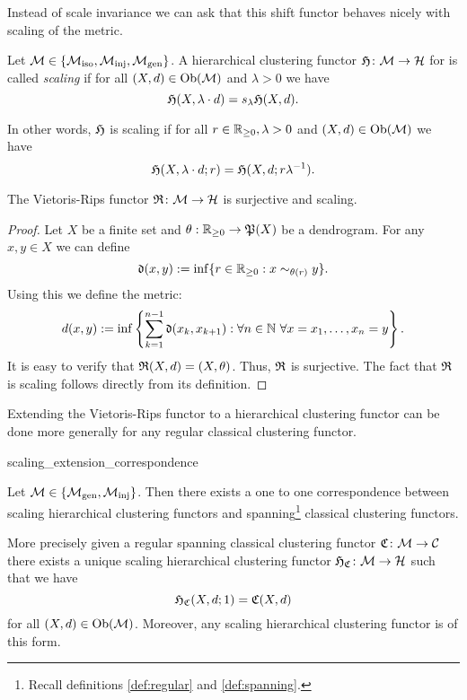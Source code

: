 Instead of scale invariance we can ask that this shift functor behaves nicely with scaling of the metric.

\begin{definition}{}{}
Let $\mathcal{M} \in \{{\mathcal{M}_\mathrm{iso}},{\mathcal{M}_\mathrm{inj}},{\mathcal{M}_\mathrm{gen}}\}$. A hierarchical clustering functor $\mathfrak{H}\colon \mathcal{M} \to \mathcal{H}$ for  is called \emph{scaling} if for all ${(X,d) \in \mathrm {Ob}(\mathcal{M})}$ and $\lambda > 0$ we have
$$
\mathfrak{H}(X, \lambda \cdot d) = s_\lambda \mathfrak{H}(X,d).
$$
\end{definition}

In other words, $\mathfrak{H}$ is scaling if for all $r \in \mathbb R_{\geq0}, \lambda > 0$ and $(X,d) \in \mathrm {Ob}(\mathcal{M})$ we have
$$
\mathfrak{H}(X, \lambda \cdot d; r) = \mathfrak{H}(X,d; r \lambda^{-1}).
$$

\begin{proposition}{\cite[Sec.~7.3.1]{Carlsson2010}}{}
The Vietoris-Rips functor $\mathfrak{R}\colon \mathcal{M} \to \mathcal{H}$ is surjective and scaling.
\end{proposition}

\begin{proof}
Let $X$ be a finite set and $\theta: \mathbb R_{\geq0} \to \mathfrak{P}(X)$ be a dendrogram. For any $x,y \in X$ we can define
$$
\mathfrak{d}(x,y) := \inf\{r \in \mathbb R_{\geq0}: x \sim_{\theta(r)} y\}.
$$
Using this we define the metric:
$$
d(x,y) := \inf\left\{\sum_{k=1}^{n-1} \mathfrak{d}(x_k, x_{k+1}): \forall n \in \mathbb N \ \forall x = x_1, \dots, x_n = y\right\}.
$$
It is easy to verify that $\mathfrak{R}(X,d) = (X,\theta)$. Thus, $\mathfrak{R}$ is surjective. The fact that $\mathfrak{R}$ is scaling follows directly from its definition.
\end{proof}



Extending the Vietoris-Rips functor to a hierarchical clustering functor can be done more generally for any regular classical clustering functor.
\begin{proposition}{}{scaling_extension_correspondence}

Let $\mathcal{M} \in \{{\mathcal{M}_\mathrm{gen}},{\mathcal{M}_\mathrm{inj}}\}$. Then there exists a one to one correspondence between
scaling hierarchical clustering functors and spanning\footnote{Recall definitions \ref{def:regular} and \ref{def:spanning}.} classical clustering functors.

\medskip
More precisely given a regular spanning classical clustering functor $\mathfrak{C}\colon \mathcal{M} \to \mathcal{C}$ there exists a unique scaling hierarchical clustering functor $\mathfrak{H}_{\mathfrak{C}}\colon \mathcal{M} \to \mathcal{H}$ such that we have
$$
\mathfrak{H}_{\mathfrak{C}}(X,d; 1) = \mathfrak{C}(X,d)
$$
for all $(X,d) \in \mathrm {Ob}(\mathcal{M})$.
Moreover, any scaling hierarchical clustering functor is of this form.
\end{proposition}


